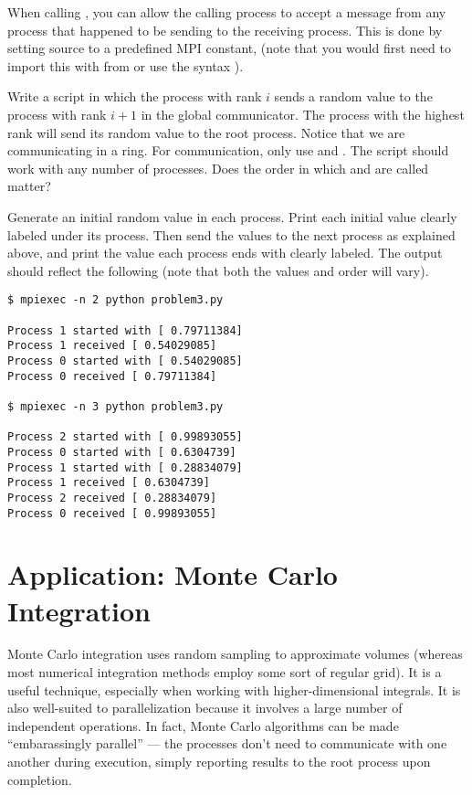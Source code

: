 \begin{info}
    When calling , you can allow the calling process to accept a message from any process that happened to be sending to the receiving process.
    This is done by setting source to a predefined MPI constant,  (note that you would first need to import this with from  or use the syntax ).
\end{info}

\begin{problem}
Write a script in which the process with rank $i$ sends a random value to the process with rank $i+1$ in the global communicator.
The process with the highest rank will send its random value to the root process.
Notice that we are communicating in a ring.
For communication, only use  and .
The script should work with any number of processes.
Does the order in which  and  are called matter?

Generate an initial random value in each process.
Print each initial value clearly labeled under its process.
Then send the values to the next process as explained above, and print the value each process ends with clearly labeled.
The output should reflect the following (note that both the values and order will vary).
\begin{lstlisting}[style=ShellOutput]
$ mpiexec -n 2 python problem3.py

Process 1 started with [ 0.79711384]
Process 1 received [ 0.54029085]
Process 0 started with [ 0.54029085]
Process 0 received [ 0.79711384]

$ mpiexec -n 3 python problem3.py

Process 2 started with [ 0.99893055]
Process 0 started with [ 0.6304739]
Process 1 started with [ 0.28834079]
Process 1 received [ 0.6304739]
Process 2 received [ 0.28834079]
Process 0 received [ 0.99893055]
\end{lstlisting}
\end{problem}

\section*{Application: Monte Carlo Integration}

Monte Carlo integration uses random sampling to approximate volumes (whereas most numerical integration methods employ some sort of regular grid).
It is a useful technique, especially when working with higher-dimensional integrals.
It is also well-suited to parallelization because it involves a large number of independent operations.
In fact, Monte Carlo algorithms can be made ``embarassingly parallel'' --- the processes don't need to communicate with one another during execution, simply reporting results to the root process upon completion.

